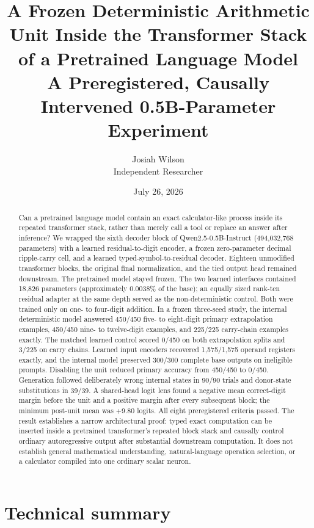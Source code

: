 \documentclass[11pt]{article}
\title{\textbf{A Frozen Deterministic Arithmetic Unit Inside the
Transformer Stack of a Pretrained Language Model}\\
\large A Preregistered, Causally Intervened 0.5B-Parameter Experiment}
\author{Josiah Wilson\\Independent Researcher}
\date{July 26, 2026}
\begin{document}
\maketitle

\begin{abstract}
Can a pretrained language model contain an exact calculator-like process
inside its repeated transformer stack, rather than merely call a tool or
replace an answer after inference? We wrapped the sixth decoder block of
Qwen2.5-0.5B-Instruct (494,032,768 parameters) with a learned
residual-to-digit encoder, a frozen zero-parameter decimal ripple-carry cell,
and a learned typed-symbol-to-residual decoder. Eighteen unmodified
transformer blocks, the original final normalization, and the tied output head
remained downstream. The pretrained model stayed frozen. The two learned
interfaces contained 18,826 parameters (approximately 0.0038\% of the base);
an equally sized rank-ten residual adapter at the same depth served as the
non-deterministic control. Both were trained only on one- to four-digit
addition. In a frozen three-seed study, the internal deterministic model
answered 450/450 five- to eight-digit primary extrapolation examples, 450/450
nine- to twelve-digit examples, and 225/225 carry-chain examples exactly.
The matched learned control scored 0/450 on both extrapolation splits and
3/225 on carry chains. Learned input encoders recovered 1,575/1,575 operand
registers exactly, and the internal model preserved 300/300 complete base
outputs on ineligible prompts. Disabling the unit reduced primary accuracy
from 450/450 to 0/450. Generation followed deliberately wrong internal states
in 90/90 trials and donor-state substitutions in 39/39. A shared-head logit
lens found a negative mean correct-digit margin before the unit and a positive
margin after every subsequent block; the minimum post-unit mean was +9.80
logits. All eight preregistered criteria passed. The result establishes a
narrow architectural proof: typed exact computation can be inserted inside a
pretrained transformer's repeated block stack and causally control ordinary
autoregressive output after substantial downstream computation. It does not
establish general mathematical understanding, natural-language operation
selection, or a calculator compiled into one ordinary scalar neuron.
\end{abstract}

\section*{Technical summary}
\end{document}
